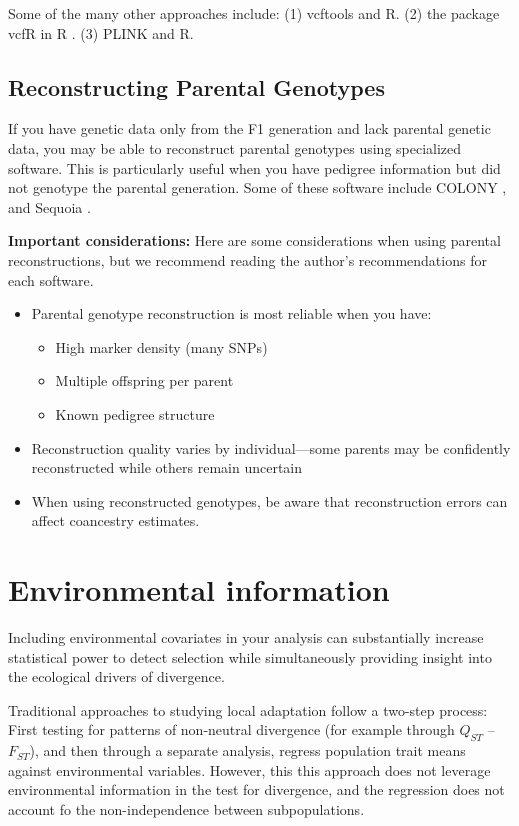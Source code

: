 \documentclass[11pt]{article}
\begin{document}
Some of the many other approaches include: (1) vcftools \cite{danecek2011variant} and R. (2) the package vcfR in R \cite{knaus2017vcfr}. (3) PLINK \cite{weeks2010plink} and R. 


\subsection{Reconstructing Parental Genotypes}

If you have genetic data only from the F1 generation and lack parental genetic data, you may be able to reconstruct parental genotypes using specialized software. This is particularly useful when you have pedigree information but did not genotype the parental generation. Some of these software include COLONY \cite{jones2010colony}, and Sequoia \cite{huisman2017pedigree}.

\textbf{Important considerations:}
Here are some considerations when using parental reconstructions, but we recommend reading the author's recommendations for each software.

\begin{itemize}
\item Parental genotype reconstruction is most reliable when you have:
  \begin{itemize}
  \item High marker density (many SNPs)
  \item Multiple offspring per parent
  \item Known pedigree structure
  \end{itemize}
\item Reconstruction quality varies by individual—some parents may be confidently reconstructed while others remain uncertain
\item When using reconstructed genotypes, be aware that reconstruction errors can affect coancestry estimates. 
\end{itemize}

\section{Environmental information}
Including environmental covariates in your analysis can substantially increase statistical power to detect selection while simultaneously providing insight into the ecological drivers of divergence. 

Traditional approaches to studying local adaptation follow a two-step process: First testing for patterns of non-neutral divergence (for example through $Q_{ST}$ -- $F_{ST}$), and then through a separate analysis, regress population trait means against environmental variables. However, this this approach does not leverage environmental information in the test for divergence, and the regression does not account fo the non-independence between subpopulations. 
\end{document}
